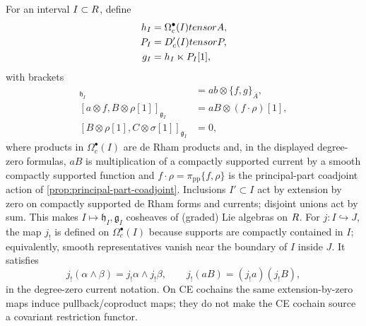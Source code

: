 \documentclass[11pt]{memoir}
\begin{document}
\begin{constr}\label{constr:interval-fact-algebras}
  For an interval $I\subset R$, define
  \begin{align*}
    h_I&=\Omega_c^\bullet(I)tensorA,\\
    P_I&=D'_c(I)tensorP,\\
    g_I&=h_I\ltimes P_I[1],
  \end{align*}
  with brackets
  \begin{align*}
    [a\otimes f,b\otimes g]_{\mathfrak h_I}&=ab\otimes\{f,g\}_{\bar A},\\
    [a\otimes f,B\otimes\rho[1]]_{\mathfrak g_I}&=aB\otimes(f\cdot\rho)[1],\\
    [B\otimes\rho[1],C\otimes\sigma[1]]_{\mathfrak g_I}&=0,
  \end{align*}
  where products in $\Omega_c^\bullet(I)$ are de Rham products and, in
  the displayed degree-zero formulas, $aB$ is multiplication of a
  compactly supported current by a smooth compactly supported function and
  $f\cdot\rho=\pi_{\mathrm{pp}}\{f,\rho\}$ is the principal-part
  coadjoint action of \ref{prop:principal-part-coadjoint}. Inclusions
  $I'\subset I$ act by extension by zero on compactly supported de Rham
  forms and currents; disjoint unions act by sum. This makes
  $I\mapsto\mathfrak h_I,\mathfrak g_I$ cosheaves of (graded) Lie
  algebras on $R$. For \(j:I\hookrightarrow J\), the map \(j_!\) is
  defined on \(\Omega_c^\bullet(I)\) because supports are compactly
  contained in \(I\); equivalently, smooth representatives vanish near
  the boundary of \(I\) inside \(J\). It satisfies
  \[
    j_!(\alpha\wedge\beta)=j_!\alpha\wedge j_!\beta,\qquad
    j_!(aB)=(j_!a)(j_!B),
  \]
  in the degree-zero current notation. On CE cochains the same
  extension-by-zero maps induce pullback/coproduct maps; they do not
  make the CE cochain source a covariant restriction functor.


\end{constr}
\end{document}
